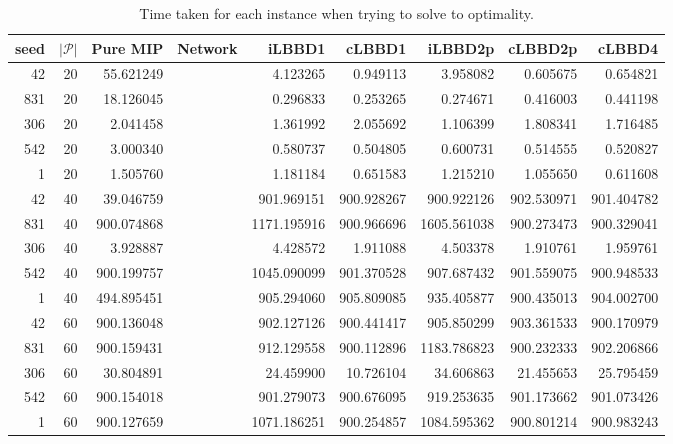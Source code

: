 \begin{table*}
    \centering
    \caption{Time taken for each instance when trying to solve to optimality.}
    \begin{tabular}{rrrrrrrrr} \toprule
        seed & $|\mathcal{P}|$ & Pure MIP & Network & iLBBD1 & cLBBD1 & iLBBD2p & cLBBD2p & cLBBD4 \\\midrule
        42     &       20    & 55.621249 &       & 4.123265 &  0.949113 & 3.958082 & 0.605675 & 0.654821 \\
       831     &       20    &18.126045 &        & 0.296833 &  0.253265 & 0.274671 & 0.416003 & 0.441198 \\
      306       &     20     &2.041458  &        & 1.361992 & 2.055692 & 1.106399 & 1.808341 & 1.716485 \\
      542       &     20     &3.000340  &       &  0.580737 & 0.504805 & 0.600731 & 0.514555 & 0.520827 \\
        1      &      20     &1.505760  &       & 1.181184 & 0.651583 & 1.215210 & 1.055650 & 0.611608 \\\midrule
       42      &      40    &   39.046759 &   &  901.969151 & 900.928267  & 900.922126 &  902.530971 & 901.404782 \\
     831       &     40    & 900.074868 &     &  1171.195916 & 900.966696 & 1605.561038 &  900.273473 & 900.329041 \\
     306       &     40    &  3.928887 &      &     4.428572  &  1.911088  &   4.503378  &  1.910761  &  1.959761 \\
    542       &     40   & 900.199757 &      &  1045.090099  & 901.370528  & 907.687432 &  901.559075 & 900.948533 \\
     1        &    40  &  494.895451  &      &  905.294060 &  905.809085  &  935.405877 & 900.435013 & 904.002700 \\\midrule
     42       &     60 &  900.136048  &       & 902.127126 &  900.441417  & 905.850299 &  903.361533 &  900.170979 \\
     831      &      60 &  900.159431  &      & 912.129558 & 900.112896 & 1183.786823 &  900.232333 &  902.206866 \\
     306      &      60  &  30.804891 &      &  24.459900  & 10.726104  &  34.606863 &  21.455653 &  25.795459 \\
     542      &      60 & 900.154018 &      &  901.279073 & 900.676095 &  919.253635 & 901.173662 & 901.073426 \\
     1        &    60  & 900.127659 &       & 1071.186251 & 900.254857 & 1084.595362 &  900.801214 & 900.983243 \\
     
     \bottomrule
    \end{tabular}
\end{table*}
